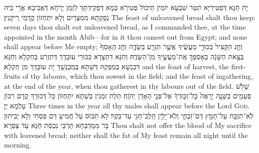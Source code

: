 {יָת חַגָּא דְּפַטִּירַיָּא תִטַּר שִׁבְעָא יוֹמִין תֵּיכוֹל פַּטִּירָא כְּמָא דְּפַקֵּידְתָּךְ לִזְמַן יַרְחָא דַּאֲבִיבָא אֲרֵי בֵיהּ נְפַקְתָּא מִמִּצְרָיִם וְלָא יִתַּחְזוֹן קֳדָמַי רֵיקָנִין׃}
{The feast of unleavened bread shalt thou keep; seven days thou shalt eat unleavened bread, as I commanded thee, at the time appointed in the month Abib—for in it thou camest out from Egypt; and none shall appear before Me empty;}{}
{וְחַ֤ג הַקָּצִיר֙ בִּכּוּרֵ֣י מַעֲשֶׂ֔יךָ אֲשֶׁ֥ר תִּזְרַ֖ע בַּשָּׂדֶ֑ה וְחַ֤ג הָֽאָסִף֙ בְּצֵ֣את הַשָּׁנָ֔ה בְּאׇסְפְּךָ֥ אֶֽת־מַעֲשֶׂ֖יךָ מִן־הַשָּׂדֶֽה׃
}
{וְחַגָּא דִחְצָדָא בִּכּוּרֵי עוּבָדָךְ דְּתִזְרַע בְּחַקְלָא וְחַגָּא דִּכְנָשָׁא בְּמִפְּקַהּ דְּשַׁתָּא בְּמִכְנְשָׁךְ יָת עוּבָדָךְ מִן חַקְלָא׃}
{and the feast of harvest, the first-fruits of thy labours, which thou sowest in the field; and the feast of ingathering, at the end of the year, when thou gatherest in thy labours out of the field.}{}
{שָׁלֹ֥שׁ פְּעָמִ֖ים בַּשָּׁנָ֑ה יֵרָאֶה֙ כׇּל־זְכ֣וּרְךָ֔ אֶל־פְּנֵ֖י הָאָדֹ֥ן \pasek  יְהֹוָֽה׃
}
{תְּלָת זִמְנִין בְּשַׁתָּא יִתַּחְזוֹן כָּל דְּכוּרָךְ קֳדָם רִבּוֹן עָלְמָא יְיָ׃}
{Three times in the year all thy males shall appear before the Lord \textsc{God}.}{}
{לֹֽא־תִזְבַּ֥ח עַל־חָמֵ֖ץ דַּם־זִבְחִ֑י וְלֹֽא־יָלִ֥ין חֵֽלֶב־חַגִּ֖י עַד־בֹּֽקֶר׃
}
{לָא תִכּוֹס עַל חֲמִיעַ דַּם פִּסְחִי וְלָא יְבִיתוּן בָּר מִמַּדְבְּחָא תַּרְבֵּי נִכְסַת חַגָּא עַד צַפְרָא׃}
{Thou shalt not offer the blood of My sacrifice with leavened bread; neither shall the fat of My feast remain all night until the morning.}{}
